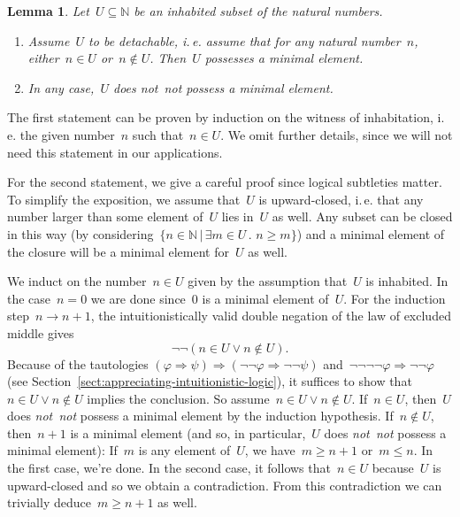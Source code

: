 \documentclass[10pt,reqno,a4paper]{amsbook}
\makeatletter
\theoremstyle{definition}
\theoremstyle{plain}
\newtheorem{lemma}[defn]{Lemma}
\theoremstyle{remark}
\newcommand{\NN}{\mathbb{N}}
\newcommand{\?}{\,{:}\,}
\renewcommand{\_}{\mathpunct{.}\,}
\newcommand{\ie}{i.\,e.\@\xspace}
\newcommand{\notnot}{\emph{not~not}\xspace}
\renewenvironment{proof}[1][\proofname]{\par
  \pushQED{\qed}%
  \normalfont \topsep6\p@\@plus6\p@\relax
  \trivlist
  \item[\hskip\labelsep
        \itshape
    #1\@addpunct{.}]\ignorespaces
}{%
  \popQED\endtrivlist\@endpefalse
}
\makeatother
\begin{document}
\begin{lemma}\label{lemma:minimum-subset-naturals}
Let~$U \subseteq \NN$ be an inhabited subset of the natural
numbers.
\begin{enumerate}
\item Assume~$U$ to be \emph{detachable}, \ie assume that for any natural
number~$n$, either~$n \in U$ or~$n \not\in U$. Then~$U$ possesses a minimal
element.
\item In any case,~$U$ does \notnot possess a minimal element.
\end{enumerate}
\end{lemma}
\begin{proof}
The first statement can be proven by induction on the witness of inhabitation,
\ie the given number~$n$ such that~$n \in U$. We omit further details, since we will
not need this statement in our applications.

For the second statement, we give a careful proof since logical subtleties matter. To simplify the
exposition, we assume that~$U$ is upward-closed, \ie that any number
larger than some element of~$U$ lies in~$U$ as well. Any subset can be closed
in this way (by considering~$\{ n \in \NN \,|\, \exists m \in U\_ n \geq m \}$)
and a minimal element of the closure will be a minimal element for~$U$ as well.

We induct on the number~$n \in U$ given by the assumption that~$U$ is
inhabited. In the case~$n = 0$ we are done since~$0$ is a minimal element
of~$U$. For the induction step~$n \to n+1$, the intuitionistically valid double
negation of the law of excluded middle
gives
\[ \neg\neg(n \in U \vee n \not\in U). \]
Because of the tautologies $(\varphi \Rightarrow \psi) \Rightarrow
(\neg\neg\varphi \Rightarrow \neg\neg\psi)$ and~$\neg\neg\neg\neg\varphi \Rightarrow
\neg\neg\varphi$ (see Section~\ref{sect:appreciating-intuitionistic-logic}), it
suffices to show that~$n \in U \vee n \not\in U$ implies the conclusion.
So assume~$n \in U \vee n \not\in U$.
If~$n \in U$, then~$U$ does \notnot possess a minimal element by the induction
hypothesis. If~$n \not\in U$, then~$n+1$ is a minimal element (and so, in
particular,~$U$ does \notnot possess a minimal element): If~$m$ is
any element of~$U$, we have~$m \geq n+1$ or~$m \leq n$. In the first case,
we're done. In the second case, it follows that~$n \in U$ because~$U$ is
upward-closed and so we obtain a contradiction. From this contradiction we
can trivially deduce~$m \geq n+1$ as well. \qedhere
\end{proof}
\end{document}
